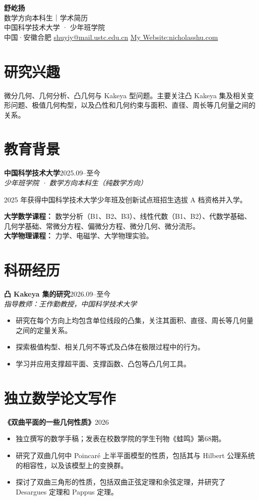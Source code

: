\documentclass[10pt,a4paper,fontset=windows]{ctexart}
\newcommand{\entry}[3]{%
  \textbf{#1}\hfill{\small #2}\\%
  {\emph{#3}}\par%
}
\begin{document}
\begin{center}
{\LARGE\bfseries 舒屹扬}\\[4pt]
{\normalsize 数学方向本科生｜学术简历}\\[2pt]
中国科学技术大学 · 少年班学院\\[2pt]
中国·安徽合肥 \quad\textbar\quad \href{mailto:shuyiy@mail.ustc.edu.cn}{shuyiy@mail.ustc.edu.cn} \quad\textbar\quad \href{https://nicholasshu.com}{My Website:nicholasshu.com}
\end{center}
\vspace{-7pt}
\section*{研究兴趣}
微分几何、几何分析、凸几何与 Kakeya 型问题。主要关注凸 Kakeya 集及相关变形问题、极值几何构型，以及凸性和几何约束与面积、直径、周长等几何量之间的关系。
\section*{教育背景}
\entry{中国科学技术大学}{2025.09--至今}{少年班学院 · 数学方向本科生（纯数学方向）}
2025 年获得中国科学技术大学少年班及创新试点班招生选拔 A 档资格并入学。
\par
\textbf{大学数学课程：} 数学分析（B1、B2、B3）、线性代数（B1、B2）、代数学基础、几何学基础、常微分方程、偏微分方程、微分几何、微分流形。\\
\textbf{大学物理课程：} 力学、电磁学、大学物理实验。
\section*{科研经历}
\entry{凸 Kakeya 集的研究}{2026.09--至今}{指导教师：王作勤教授，中国科学技术大学}
\begin{itemize}
\item 研究在每个方向上均包含单位线段的凸集，关注其面积、直径、周长等几何量之间的定量关系。
\item 探索极值构型、相关几何不等式及凸体在极限过程中的行为。
\item 学习并应用支撑超平面、支撑函数、凸包等凸几何工具。
\end{itemize}
\section*{独立数学论文写作}
\textbf{《双曲平面的一些几何性质》}\hfill{\small 2026}\par
\begin{itemize}
\item 独立撰写的数学手稿；发表在校数学院的学生刊物《蛙鸣》第68期。

\item 研究了双曲几何中 Poincaré 上半平面模型的性质，包括其与 Hilbert 公理系统的相容性，以及该模型上的变换群。
\item 探讨了双曲三角形的性质，包括双曲正弦定理和余弦定理，并研究了 Desargues 定理和 Pappus 定理。
\end{itemize}
\end{document}
